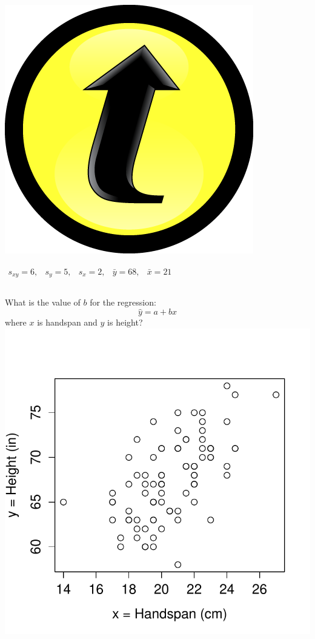 \documentclass[handout]{beamer}
\begin{document}
\begin{frame}
\frametitle{\includegraphics[scale = 0.05]{./images/clicker}}
\alert{$\begin{array}{ccccc} s_{xy} = 6,&s_y = 5,& s_x = 2,& \bar{y} = 68,& \bar{x} = 21\end{array}$}
\begin{columns}[c]
\column{2.5in}
What is the value of $b$ for the regression: $$\hat{y}=a+bx$$
where \alert{$x$ is handspan and $y$ is height? }
\column{1.8in}
\includegraphics[scale = 0.4]{./images/handspan_height}
\end{columns}
\alert{$$\phantom{b = \frac{s_{xy}}{s_x^2} = 6 /2.2^2 \approx 1.2}$$}
\end{frame}
\end{document}
